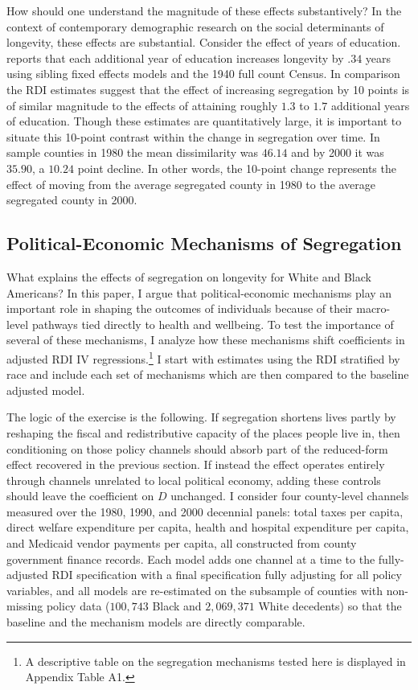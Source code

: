 \documentclass[11pt]{article}
\begin{document}
How should one understand the magnitude of these effects substantively? In the context of contemporary demographic research on the social determinants of longevity, these effects are substantial. Consider the effect of years of education. \citet{halpern-manners_effects_2020} reports that each additional year of education increases longevity by $.34$ years using sibling fixed effects models and the 1940 full count Census. In comparison the RDI estimates suggest that the effect of increasing segregation by 10 points is of similar magnitude to the effects of attaining roughly $1.3$ to $1.7$ additional years of education. Though these estimates are quantitatively large, it is important to situate this 10-point contrast within the change in segregation over time. In sample counties in 1980 the mean dissimilarity was $46.14$ and by 2000 it was $35.90$, a $10.24$ point decline. In other words, the 10-point change represents the effect of moving from the average segregated county in 1980 to the average segregated county in 2000.

\subsection{Political-Economic Mechanisms of Segregation}

What explains the effects of segregation on longevity for White and Black Americans? In this paper, I argue that political-economic mechanisms play an important role in shaping the outcomes of individuals because of their macro-level pathways tied directly to health and wellbeing. To test the importance of several of these mechanisms, I analyze how these mechanisms shift coefficients in adjusted RDI IV regressions.\footnote{A descriptive table on the segregation mechanisms tested here is displayed in Appendix Table A1.} I start with estimates using the RDI stratified by race and include each set of mechanisms which are then compared to the baseline adjusted model. 

The logic of the exercise is the following. If segregation shortens lives partly by reshaping the fiscal and redistributive capacity of the places people live in, then conditioning on those policy channels should absorb part of the reduced-form effect recovered in the previous section. If instead the effect operates entirely through channels unrelated to local political economy, adding these controls should leave the coefficient on $D$ unchanged. I consider four county-level channels measured over the 1980, 1990, and 2000 decennial panels: total taxes per capita, direct welfare expenditure per capita, health and hospital expenditure per capita, and Medicaid vendor payments per capita, all constructed from county government finance records. Each model adds one channel at a time to the fully-adjusted RDI specification with a final specification fully adjusting for all policy variables, and all models are re-estimated on the subsample of counties with non-missing policy data ($100{,}743$ Black and $2{,}069{,}371$ White decedents) so that the baseline and the mechanism models are directly comparable.
\end{document}

